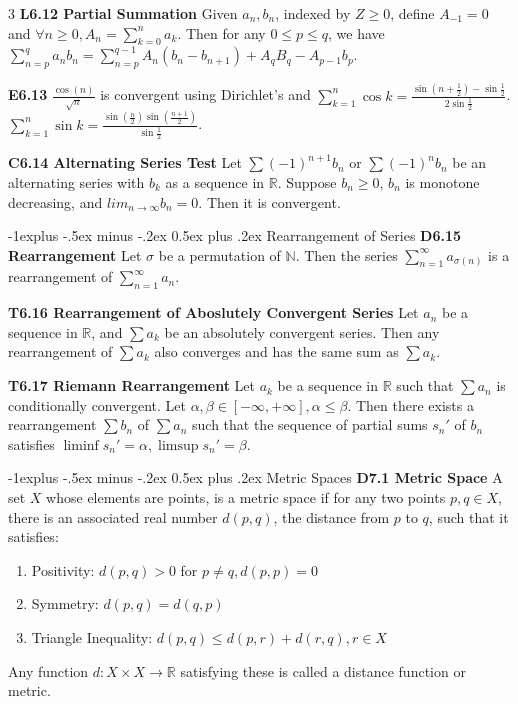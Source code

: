 \documentclass[10pt, landscape]{article}
\makeatletter
\renewcommand{\section}{\@startsection{section}{1}{0mm}%
                                {-1ex plus -.5ex minus -.2ex}%
                                {0.5ex plus .2ex}%
                                {\normalfont\large\bfseries}}
\renewcommand{\section}{\@startsection{section}{2}{0mm}%
                                {-1explus -.5ex minus -.2ex}%
                                {0.5ex plus .2ex}%
                                {\normalfont\normalsize\bfseries}}
\makeatother
\begin{document}
\begin{multicols*}{3}
\textbf{L6.12 Partial Summation} Given $a_n, b_n$, indexed by $Z \geq 0$, define $A_{-1}=0$ and $\forall n \geq 0, A_n=\sum_{k=0}^n a_k$. Then for any $0\leq p \leq q$, we have $\sum_{n=p}^qa_nb_n=\sum_{n=p}^{q-1} A_n(b_n-b_{n+1})+A_qB_q-A_{p-1}b_p$.

\textbf{E6.13} $\frac{\cos (n)}{\sqrt{n}}$ is convergent using Dirichlet's and $\sum_{k=1}^n \cos k= \frac{\sin(n+\frac{1}{2})-\sin \frac{1}{2}}{2\sin\frac{1}{2}}$. $\sum_{k=1}^n \sin k= \frac{\sin(\frac{n}{2})\sin(\frac{n+1}{2})}{\sin\frac{1}{2}}$.

\textbf{C6.14 Alternating Series Test} Let $\sum (-1)^{n+1} b_n$ or $\sum (-1)^nb_n$ be an alternating series with $b_k$ as a sequence in $\mathbb{R}$. Suppose $b_n \geq 0$, $b_n$ is monotone decreasing, and $lim_{n\rightarrow\infty} b_n=0$. Then it is convergent.

\section{Rearrangement of Series}
\textbf{D6.15 Rearrangement} Let $\sigma$ be a permutation of $\mathbb{N}$. Then the series $\sum_{n=1}^\infty a_{\sigma(n)}$ is a rearrangement of $\sum_{n=1}^\infty a _n$.

\textbf{T6.16 Rearrangement of Aboslutely Convergent Series} Let $a_n$ be a sequence in $\mathbb{R}$, and $\sum a_k$ be an absolutely convergent series. Then any rearrangement of $\sum a_k$ also converges and has the same sum as $\sum a_k$.

\textbf{T6.17 Riemann Rearrangement} Let $a_k$ be a sequence in $\mathbb{R}$ such that $\sum a_n$ is conditionally convergent. Let $\alpha, \beta \in [-\infty, +\infty], \alpha \leq \beta$. Then there exists a rearrangement $\sum b_n$ of $\sum a_n$ such that the sequence of partial sums $s_n'$ of $b_n$ satisfies $\liminf s_n'=\alpha, \limsup s_n'=\beta$.

\section{Metric Spaces}
\textbf{D7.1 Metric Space} A set $X$ whose elements are points, is a metric space if for any two points $p, q \in X$, there is an associated real number $d(p, q)$, the distance from $p$ to $q$, such that it satisfies:
\begin{enumerate}
    \item Positivity: $d(p, q) > 0$ for $p \neq q, d(p, p)=0$
    \item Symmetry: $d(p, q)=d(q, p)$
    \item Triangle Inequality: $d(p, q) \leq d(p, r) + d(r, q), r \in X$
\end{enumerate}
Any function $d:X\times X \rightarrow\mathbb{R}$ satisfying these is called a distance function or metric.


\end{multicols*}
\end{document}
